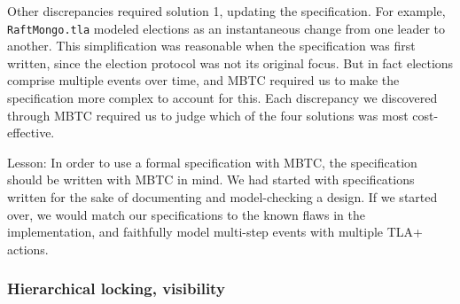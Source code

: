 \documentclass{vldb}
\begin{document}
Other discrepancies required solution 1, updating the specification. For example, \texttt{RaftMongo.tla} modeled elections as an instantaneous change from one leader to another. This simplification was reasonable when the specification was first written, since the election protocol was not its original focus. But in fact elections comprise multiple events over time, and MBTC required us to make the specification more complex to account for this. Each discrepancy we discovered through MBTC required us to judge which of the four solutions was most cost-effective.

Lesson: In order to use a formal specification with MBTC, the specification should be written with MBTC in mind. We had started with specifications written for the sake of documenting and model-checking a design. If we started over, we would match our specifications to the known flaws in the implementation, and faithfully model multi-step events with multiple TLA+ actions.

\subsubsection{Hierarchical locking, visibility}




\end{document}
